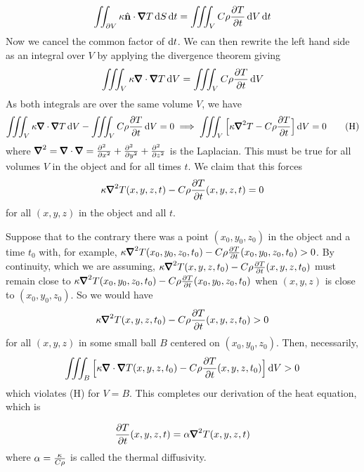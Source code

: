 \begin{equation*}
\dblInt_{\partial V} \ka\hn\cdot\vnabla T\,\dee{S}\,\dee{t}
=\tripInt_V C\rho\frac{\partial T}{\partial t}\,\dee{V}\,\dee{t}
\end{equation*}
Now we cancel the common factor of $\mathrm{d}t$. We can then rewrite the
left hand side as an integral over $V$ by applying the divergence theorem
giving
\begin{equation*}
\tripInt_{V} \ka\vnabla\cdot\vnabla T\,\dee{V}
=\tripInt_V C\rho\frac{\partial T}{\partial t}\,\dee{V}
\end{equation*}
As both integrals are over the same volume $V$, we have
\begin{equation}
\tripInt_{V} \ka\vnabla\cdot\vnabla T\,\dee{V}
-\tripInt_V C\rho\frac{\partial T}{\partial t}\,\dee{V}
=0
\implies 
\tripInt_{V} \Big[\ka\vnabla^2 T
          -C\rho\frac{\partial T}{\partial t}\Big]\,\dee{V}=0
\tag{H}\end{equation}
where $\vnabla^2=\vnabla\cdot\vnabla=\frac{\partial^2\hfill}{\partial x^2}+
\frac{\partial^2\hfill}{\partial y^2}+\frac{\partial^2\hfill}{\partial z^2}$
is the Laplacian.
This must be true for all volumes $V$ in the object and for all times $t$. We
claim that this forces 
\begin{equation*}
\ka\vnabla^2 T(x,y,z,t)-C\rho\frac{\partial T}{\partial t}(x,y,z,t)=0
\end{equation*}
for all $(x,y,z)$ in the object and all $t$.

Suppose that to the contrary there was a point $(x_0,y_0,z_0)$ in the object
and a time $t_0$ with, for example,
$\ka\vnabla^2 T(x_0,y_0,z_0,t_0)
   -C\rho\frac{\partial T}{\partial t}(x_0,y_0,z_0,t_0)>0$. 
By continuity, which we are assuming, $\ka\vnabla^2 T(x,y,z,t_0)
   -C\rho\frac{\partial T}{\partial t}(x,y,z,t_0)$
must remain close to $\ka\vnabla^2 T(x_0,y_0,z_0,t_0)
   -C\rho\frac{\partial T}{\partial t}(x_0,y_0,z_0,t_0)$ when $(x,y,z)$ 
is close to $(x_0,y_0,z_0)$.
So we would have 
\begin{equation*}
\ka\vnabla^2 T(x,y,z,t_0)
-C\rho\frac{\partial T}{\partial t}(x,y,z,t_0)>0
\end{equation*}
for all $(x,y,z)$ in some small ball $B$ centered on $(x_0,y_0,z_0)$. 
Then, necessarily,
\begin{equation*}
\tripInt_{B} \Big[\ka\vnabla\cdot\vnabla T(x,y,z,t_0)
      -C\rho\frac{\partial T}{\partial t}(x,y,z,t_0)\Big]\,\dee{V}>0
\end{equation*}
which violates (H) for $V=B$.  This completes our derivation of the 
heat equation, which is
\begin{impeqn}\label{eqn:heat}
\begin{equation*}
\frac{\partial T}{\partial t}(x,y,z,t)
=\alpha \vnabla^2 T(x,y,z,t)
\end{equation*}
where $\alpha=\frac{\kappa}{C\rho}$ is called the thermal diffusivity.
\end{impeqn}


